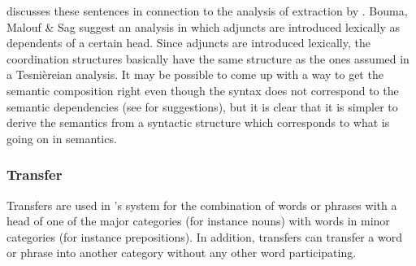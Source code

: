 \addlines
\citet[]{Levine2003a} discusses these sentences in connection to the \hpsg analysis of
extraction by \citet*{BMS2001a}. Bouma, Malouf \& Sag suggest an analysis in which adjuncts are
introduced lexically as dependents of a certain head. Since adjuncts are introduced lexically, the
coordination structures basically have the same structure as the ones assumed in a
Tesnièreian analysis. It may be possible to come up with a way to get the semantic composition right
even though the syntax does not correspond to the semantic dependencies (see \citealp{Chaves2009a} for
suggestions), but it is clear that it is simpler to derive the semantics from a syntactic structure
which corresponds to what is going on in semantics. 

\subsubsection{Transfer}
\label{sec-transfer-dg}

Transfers are used in \tes's system for the combination of words or phrases with a head of one of
the major categories (for instance nouns) with words in minor categories (for instance
prepositions). In addition, transfers can transfer a word or phrase into another category without
any other word participating.

